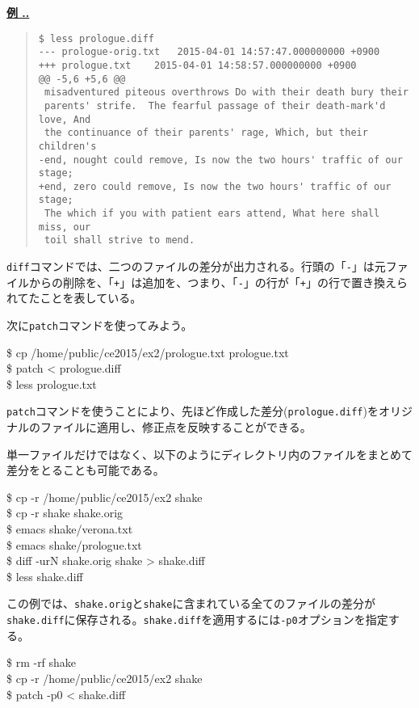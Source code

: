 \documentclass[a4j]{jsbook}
\newcommand{\prompt}{\$ }
\newenvironment{commandline2}{%
  \begin{tcolorbox}\tt%
}{%
  \end{tcolorbox}%
}
\newenvironment{myframe2}[1]{%
  \vspace{12pt}%
  \begin{breakbox}%
  {\parindent=0pt\textbf{\underline{#1}}}%
}{%
  \end{breakbox}\vspace{12pt}%
}
\newcounter{reidai}[section]
\def\thereidai{\thesection.\arabic{reidai}.}
\newenvironment{reidai}{%
  \refstepcounter{reidai}%
  \begin{myframe2}{例 \thereidai}%
  \baselineskip=12pt%
  \begin{quote}%
}{%
  \end{quote}%
  \end{myframe2}%
}
\begin{document}
\begin{reidai}
\begin{verbatim}
$ less prologue.diff
--- prologue-orig.txt	2015-04-01 14:57:47.000000000 +0900
+++ prologue.txt	2015-04-01 14:58:57.000000000 +0900
@@ -5,6 +5,6 @@
 misadventured piteous overthrows Do with their death bury their
 parents' strife.  The fearful passage of their death-mark'd love, And
 the continuance of their parents' rage, Which, but their children's
-end, nought could remove, Is now the two hours' traffic of our stage;
+end, zero could remove, Is now the two hours' traffic of our stage;
 The which if you with patient ears attend, What here shall miss, our
 toil shall strive to mend.
\end{verbatim}
\end{reidai} \noindent
{\tt diff}コマンドでは、二つのファイルの差分が出力される。行頭の「{\tt -}」は元ファイルからの削除を、「{\tt +}」は追加を、つまり、「{\tt -}」の行が「{\tt +}」の行で置き換えられてたことを表している。

次に{\tt patch}コマンドを使ってみよう。
\begin{commandline2}
\prompt cp /home/public/ce2015/ex2/prologue.txt prologue.txt \\
\prompt patch < prologue.diff \\
\prompt less prologue.txt
\end{commandline2} \noindent
{\tt patch}コマンドを使うことにより、先ほど作成した差分({\tt prologue.diff})をオリジナルのファイルに適用し、修正点を反映することができる。

単一ファイルだけではなく、以下のようにディレクトリ内のファイルをまとめて差分をとることも可能である。
\begin{commandline2}
\prompt cp -r /home/public/ce2015/ex2 shake \\
\prompt cp -r shake shake.orig \\
\prompt emacs shake/verona.txt \\
\prompt emacs shake/prologue.txt \\
\prompt diff -urN shake.orig shake > shake.diff \\
\prompt less shake.diff
\end{commandline2} \noindent
この例では、{\tt shake.orig}と{\tt shake}に含まれている全てのファイルの差分が{\tt shake.diff}に保存される。{\tt shake.diff}を適用するには{\tt -p0}オプションを指定する。
\begin{commandline2}
\prompt rm -rf shake \\
\prompt cp -r /home/public/ce2015/ex2 shake \\
\prompt patch -p0 < shake.diff
\end{commandline2}
\end{document}
